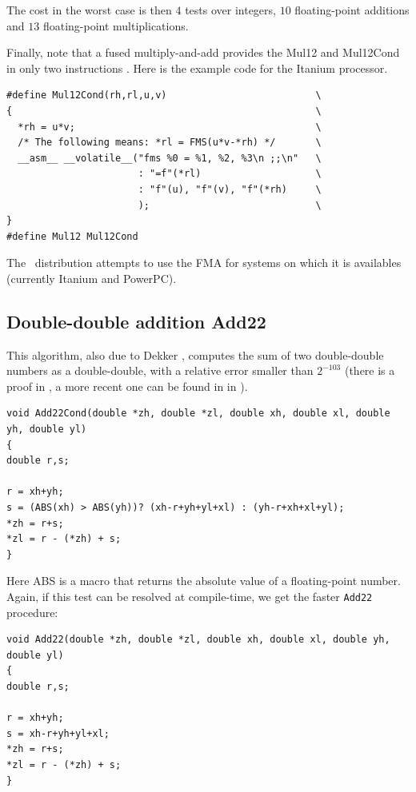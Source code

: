 The cost in the worst case is then $4$ tests over integers,
$10$ floating-point additions and $13$ floating-point multiplications.


Finally, note that a fused multiply-and-add provides the Mul12 and
Mul12Cond in only two instructions \cite{CorneaHarrisonTang2002}. Here
is the example code for the Itanium processor.

\begin{lstlisting}[label={lst:Mul12CondFMA},caption={Mul12 on the Itanium},firstnumber=1]
#define Mul12Cond(rh,rl,u,v)                          \
{                                                     \
  *rh = u*v;                                          \
  /* The following means: *rl = FMS(u*v-*rh) */       \
  __asm__ __volatile__("fms %0 = %1, %2, %3\n ;;\n"   \
                       : "=f"(*rl)                    \
                       : "f"(u), "f"(v), "f"(*rh)     \
                       );                             \
}
#define Mul12 Mul12Cond
\end{lstlisting}

The \crlibm\ distribution attempts to use the FMA for systems on which
it is availables (currently Itanium and PowerPC).




\subsection{Double-double addition {Add22}}
  
This algorithm, also due to Dekker \cite{Dek71}, computes the sum of
two double-double numbers as a double-double, with a relative error
smaller than $2^{-103}$ (there is a proof in \cite{Dek71}, a more recent one can be found in in \cite{Lau05}).


\begin{lstlisting}[label={Add22Cond},caption={Add22Cond},firstnumber=1]
void Add22Cond(double *zh, double *zl, double xh, double xl, double yh, double yl)
{
double r,s;

r = xh+yh;
s = (ABS(xh) > ABS(yh))? (xh-r+yh+yl+xl) : (yh-r+xh+xl+yl);
*zh = r+s;
*zl = r - (*zh) + s;
}
\end{lstlisting}

Here ABS is a macro that returns the absolute value of a
floating-point number. Again, if this test can be resolved at
compile-time, we get the faster \texttt{Add22} procedure:

\begin{lstlisting}[label={Add22},caption={Add22},firstnumber=1]
void Add22(double *zh, double *zl, double xh, double xl, double yh, double yl)
{
double r,s;

r = xh+yh;
s = xh-r+yh+yl+xl;
*zh = r+s;
*zl = r - (*zh) + s;
}
\end{lstlisting}




